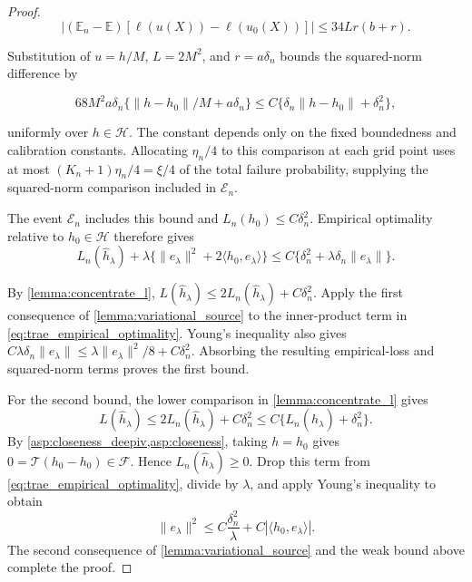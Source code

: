 \begin{proof}
{\[
\left|(\mathbb E_n-\mathbb E)[\ell(u(X))-\ell(u_0(X))]\right|
\leqslant34Lr(b+r).
\]

Substitution of $u=h/M$, $L=2M^2$, and $r=a\delta_n$ bounds the squared-norm difference by

\[
68M^2a\delta_n\{\|h-h_0\|/M+a\delta_n\}
\leqslant C\{\delta_n\|h-h_0\|+\delta_n^2\},
\]

uniformly over $h\in\mathcal H$. The constant depends only on the fixed boundedness and calibration constants. Allocating $\eta_n/4$ to this comparison at each grid point uses at most $(K_n+1)\eta_n/4=\xi/4$ of the total failure probability, supplying the squared-norm comparison included in $\mathcal E_n$.}
The event $\mathcal E_n$ includes this bound and
$L_n(h_0)\leqslant C\delta_n^2$. Empirical optimality relative to
$h_0\in\mathcal H$ therefore gives
\begin{equation}\label{eq:trae_empirical_optimality}
L_n(\hat h_\lambda)
+\lambda\{\|e_\lambda\|^2+2\langle h_0,e_\lambda\rangle\}
\leqslant C\{\delta_n^2+\lambda\delta_n\|e_\lambda\|\}.
\end{equation}

By \cref{lemma:concentrate_l},
$L(\hat h_\lambda)\leqslant2L_n(\hat h_\lambda)+C\delta_n^2$.
Apply the first consequence of \cref{lemma:variational_source} to the
inner-product term in \eqref{eq:trae_empirical_optimality}. Young's inequality also
gives
$C\lambda\delta_n\|e_\lambda\|
\leqslant\lambda\|e_\lambda\|^2/8+C\delta_n^2$.
Absorbing the resulting empirical-loss and squared-norm terms proves the
first bound.

For the second bound, the lower comparison in
\cref{lemma:concentrate_l} gives
\[
L(\hat h_\lambda)\leqslant2L_n(\hat h_\lambda)+C\delta_n^2
\leqslant C \{L_n(\hat h_\lambda)+\delta_n^2\}.
\]
By \cref{asp:closeness_deepiv,asp:closeness}, taking $h=h_0$ gives
$0=\mathcal T(h_0-h_0)\in\mathcal F$. Hence
$L_n(\hat h_\lambda)\geqslant0$. Drop this term
from \eqref{eq:trae_empirical_optimality}, divide by $\lambda$, and apply Young's
inequality to obtain
\[
\|e_\lambda\|^2
\leqslant C\frac{\delta_n^2}{\lambda}
+C|\langle h_0,e_\lambda\rangle|.
\]
The second consequence of \cref{lemma:variational_source} and the
weak bound above complete the proof.
\end{proof}

